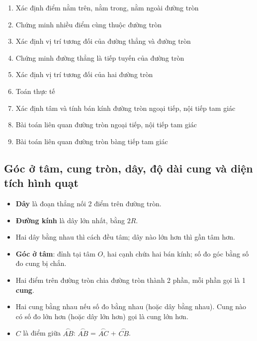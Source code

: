 \documentclass[12pt,a4paper]{article}
\begin{document}
\begin{enumerate}[label=\textbf{Dạng \arabic*:}, leftmargin=*, align=left]
  \item Xác định điểm nằm trên, nằm trong, nằm ngoài đường tròn
  \item Chứng minh nhiều điểm cùng thuộc đường tròn
  \item Xác định vị trí tương đối của đường thẳng và đường tròn
  \item Chứng minh đường thẳng là tiếp tuyến của đường tròn
  \item Xác định vị trí tương đối của hai đường tròn
  \item Toán thực tế
  \item Xác định tâm và tính bán kính đường tròn ngoại tiếp, nội tiếp tam giác
  \item Bài toán liên quan đường tròn ngoại tiếp, nội tiếp tam giác
  \item Bài toán liên quan đường tròn bàng tiếp tam giác
\end{enumerate}

\subsection{Góc ở tâm, cung tròn, dây, độ dài cung và diện tích hình quạt}

\begin{dinhnghia}
  \begin{itemize}
    \item \textbf{Dây} là đoạn thẳng nối 2 điểm trên đường tròn.
    \item \textbf{Đường kính} là dây lớn nhất, bằng $2R$.
    \item Hai dây bằng nhau thì cách đều tâm; dây nào lớn hơn thì gần tâm hơn.
  \end{itemize}
\end{dinhnghia}

\begin{dinhnghia}[title={Góc ở tâm và cung tròn}]
  \begin{itemize}
    \item \textbf{Góc ở tâm}: đỉnh tại tâm $O$, hai cạnh chứa hai bán kính; số đo góc bằng số đo cung bị chắn.
    \item Hai điểm trên đường tròn chia đường tròn thành 2 phần, mỗi phần gọi là 1 \textbf{cung}.
    \item Hai cung bằng nhau nếu số đo bằng nhau (hoặc dây bằng nhau). Cung nào có số đo lớn hơn (hoặc dây lớn hơn) gọi là cung lớn hơn.
    \item $C$ là điểm giữa $\overset{\frown}{AB}$: $\overset{\frown}{AB}$ = $\overset{\frown}{AC}$ + $\overset{\frown}{CB}$.
  \end{itemize}
\end{dinhnghia}
\end{document}

